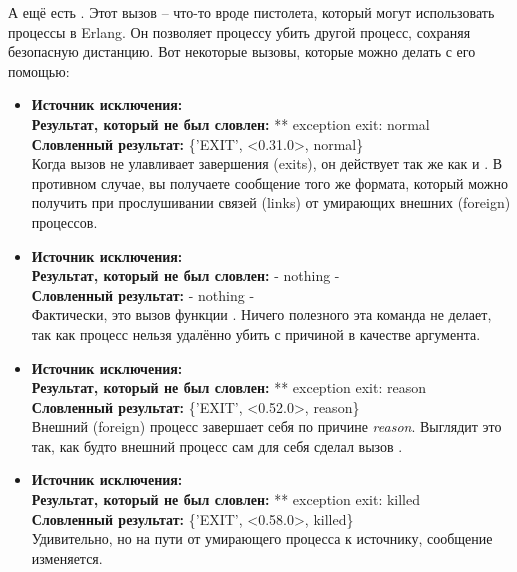 А ещё есть .
Этот вызов \--- что\--то вроде пистолета, который могут использовать процессы в Erlang.
Он позволяет процессу убить другой процесс, сохраняя безопасную дистанцию.
Вот некоторые вызовы, которые можно делать с его помощью:
\begin{itemize}
    \item 
        \textbf{Источник исключения:} \\
    \textbf{Результат, который не был словлен:} ** exception exit: normal\\
    \textbf{Словленный результат:} \{'EXIT', <0.31.0>, normal\}\\
    Когда вызов  не улавливает завершения (exits), он действует так же как и .
    В противном случае, вы получаете сообщение того же формата, который можно получить при прослушивании связей (links) от умирающих внешних (foreign) процессов.
\item 
    \textbf{Источник исключения:} \\
    \textbf{Результат, который не был словлен:} - nothing -\\
    \textbf{Словленный результат:} - nothing -\\
    Фактически, это вызов функции .
    Ничего полезного эта команда не делает, так как процесс нельзя удалённо убить с причиной  в качестве аргумента.
\item
    \textbf{Источник исключения:} \\
    \textbf{Результат, который не был словлен:} ** exception exit: reason\\
    \textbf{Словленный результат:} \{'EXIT', <0.52.0>, reason\}\\
    Внешний (foreign) процесс завершает себя по причине \emph{reason}.
    Выглядит это так, как будто внешний процесс сам для себя сделал вызов .
\item
    \textbf{Источник исключения:} \\
    \textbf{Результат, который не был словлен:} ** exception exit: killed\\
    \textbf{Словленный результат:} \{'EXIT', <0.58.0>, killed\}\\
    Удивительно, но на пути от умирающего процесса к источнику, сообщение изменяется.

\end{itemize}
